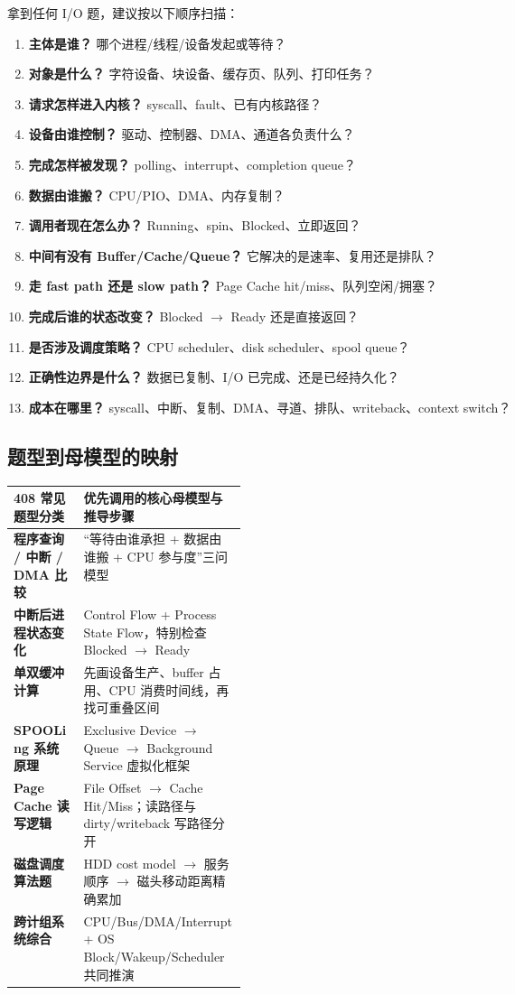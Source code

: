 \documentclass[11pt,a4paper]{ctexart}
\newcommand{\kw}[1]{\textbf{#1}}
\begin{document}
\begin{method}[I/O 十三问]
拿到任何 I/O 题，建议按以下顺序扫描：
\begin{enumerate}
  \item \kw{主体是谁？} 哪个进程/线程/设备发起或等待？
  \item \kw{对象是什么？} 字符设备、块设备、缓存页、队列、打印任务？
  \item \kw{请求怎样进入内核？} syscall、fault、已有内核路径？
  \item \kw{设备由谁控制？} 驱动、控制器、DMA、通道各负责什么？
  \item \kw{完成怎样被发现？} polling、interrupt、completion queue？
  \item \kw{数据由谁搬？} CPU/PIO、DMA、内存复制？
  \item \kw{调用者现在怎么办？} Running、spin、Blocked、立即返回？
  \item \kw{中间有没有 Buffer/Cache/Queue？} 它解决的是速率、复用还是排队？
  \item \kw{走 fast path 还是 slow path？} Page Cache hit/miss、队列空闲/拥塞？
  \item \kw{完成后谁的状态改变？} Blocked $\to$ Ready 还是直接返回？
  \item \kw{是否涉及调度策略？} CPU scheduler、disk scheduler、spool queue？
  \item \kw{正确性边界是什么？} 数据已复制、I/O 已完成、还是已经持久化？
  \item \kw{成本在哪里？} syscall、中断、复制、DMA、寻道、排队、writeback、context switch？
\end{enumerate}
\end{method}

\subsection{题型到母模型的映射}
\begingroup
\small
\renewcommand{\arraystretch}{1.25}
\setlength{\tabcolsep}{6pt}
\begin{tabularx}{\linewidth}{>{\bfseries}p{0.3\linewidth} X}
\toprule
408 常见题型分类 & 优先调用的核心母模型与推导步骤 \\
\midrule
程序查询 / 中断 / DMA 比较 & “等待由谁承担 + 数据由谁搬 + CPU 参与度”三问模型 \\
中断后进程状态变化 & Control Flow + Process State Flow，特别检查 Blocked $\rightarrow$ Ready \\
单双缓冲计算 & 先画设备生产、buffer 占用、CPU 消费时间线，再找可重叠区间 \\
SPOOLing 系统原理 & Exclusive Device $\to$ Queue $\to$ Background Service 虚拟化框架 \\
Page Cache 读写逻辑 & File Offset $\to$ Cache Hit/Miss；读路径与 dirty/writeback 写路径分开 \\
磁盘调度算法题 & HDD cost model $\to$ 服务顺序 $\to$ 磁头移动距离精确累加 \\
跨计组系统综合 & CPU/Bus/DMA/Interrupt + OS Block/Wakeup/Scheduler 共同推演 \\
\bottomrule
\end{tabularx}
\endgroup
\end{document}
